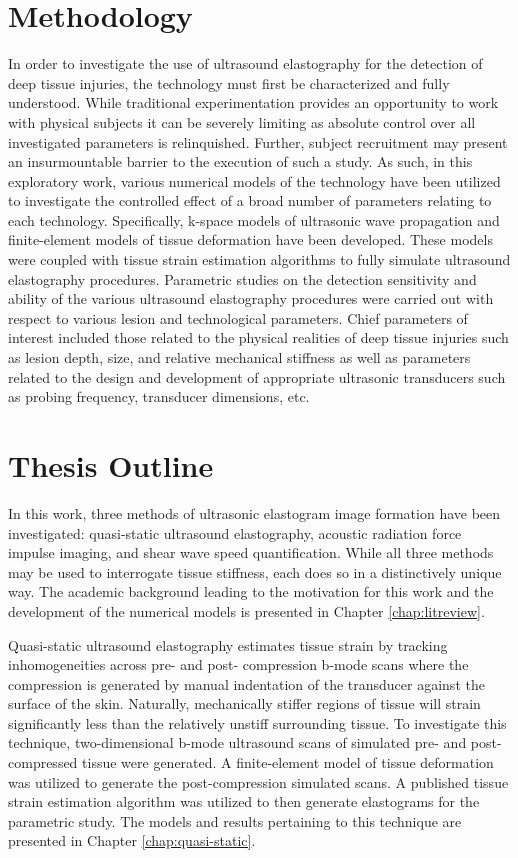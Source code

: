 	\section{Methodology}
		In order to investigate the use of ultrasound elastography for the detection of deep tissue injuries, the technology must first be characterized and fully understood. While traditional experimentation provides an opportunity to work with physical subjects it can be severely limiting as absolute control over all investigated parameters is relinquished. Further, subject recruitment may present an insurmountable barrier to the execution of such a study. As such, in this exploratory work, various numerical models of the technology have been utilized to investigate the controlled effect of a broad number of parameters relating to each technology. Specifically, k-space models of ultrasonic wave propagation and finite-element models of tissue deformation have been developed. These models were coupled with tissue strain estimation algorithms to fully simulate ultrasound elastography procedures. Parametric studies on the detection sensitivity and ability of the various ultrasound elastography procedures were carried out with respect to various lesion and technological parameters. Chief parameters of interest included those related to the physical realities of deep tissue injuries such as lesion depth, size, and relative mechanical stiffness as well as parameters related to the design and development of appropriate ultrasonic transducers such as probing frequency, transducer dimensions, etc.

	\section{Thesis Outline}
		In this work, three methods of ultrasonic elastogram image formation have been investigated: quasi-static ultrasound elastography, acoustic radiation force impulse imaging, and shear wave speed quantification. While all three methods may be used to interrogate tissue stiffness, each does so in a distinctively unique way. The academic background leading to the motivation for this work and the development of the numerical models is presented in Chapter \ref{chap:litreview}.

		Quasi-static ultrasound elastography estimates tissue strain by tracking inhomogeneities across pre- and post- compression b-mode scans where the compression is generated by manual indentation of the transducer against the surface of the skin. Naturally, mechanically stiffer regions of tissue will strain significantly less than the relatively unstiff surrounding tissue. To investigate this technique, two-dimensional b-mode ultrasound scans of simulated pre- and post-compressed tissue were generated. A finite-element model of tissue deformation was utilized to generate the post-compression simulated scans. A published tissue strain estimation algorithm was utilized to then generate elastograms for the parametric study. The models and results pertaining to this technique are presented in Chapter \ref{chap:quasi-static}.

